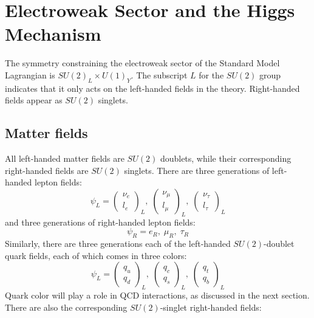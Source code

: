 \section{Electroweak Sector and the Higgs Mechanism}\label{sec:sm_ew}

The symmetry constraining the electroweak sector of the Standard Model Lagrangian is $SU(2)_L \times U(1)_Y$.
The subscript $L$ for the $SU(2)$ group indicates that it only acts on the left-handed fields in the theory.
Right-handed fields appear as $SU(2)$ singlets.

\subsection{Matter fields}\label{subsec:ew_fields}

All left-handed matter fields are $SU(2)$ doublets, while their corresponding right-handed fields are $SU(2)$ singlets.
There are three generations of left-handed lepton fields:
\begin{equation}\label{eq:left_handed_leptons}
    \psi_L =
    \begin{pmatrix}
        \nu_e \\ l_e
    \end{pmatrix}_L,\;
    \begin{pmatrix}
        \nu_{\mu} \\ l_{\mu}
    \end{pmatrix}_L,\;
     \begin{pmatrix}
        \nu_{\tau} \\ l_{\tau}
    \end{pmatrix}_L
\end{equation}
and three generations of right-handed lepton fields:
\begin{equation}\label{eq:right_handed_leptons}
\psi_R = e_R,\; \mu_R,\; \tau_R
\end{equation}
Similarly, there are three generations each of the left-handed $SU(2)$-doublet quark fields,
each of which comes in three colors:
\begin{equation}\label{eq:left_handed_quarks}
   \psi_L =
    \begin{pmatrix}
        q_u \\ q_d
    \end{pmatrix}_L,\;
    \begin{pmatrix}
        q_{c} \\ q_{s}
    \end{pmatrix}_L,\;
     \begin{pmatrix}
        q_{t} \\ q_{b}
    \end{pmatrix}_L
\end{equation}
Quark color will play a role in QCD interactions, as discussed in the next section.
There are also the corresponding $SU(2)$-singlet right-handed fields:

